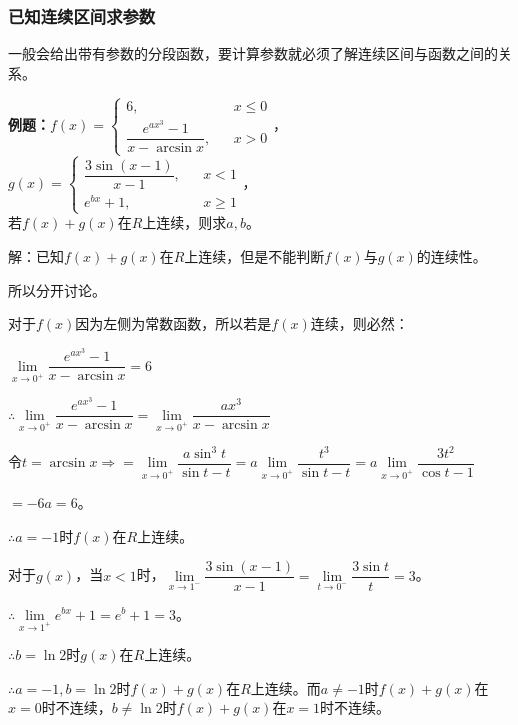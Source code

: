\subsubsection{已知连续区间求参数}

一般会给出带有参数的分段函数，要计算参数就必须了解连续区间与函数之间的关系。

\textbf{例题：}$f(x)=\left\{\begin{array}{lcl}
        6,                               &  & x\leqslant 0 \\
    \dfrac{e^{ax^3}-1}{x-\arcsin x}, &  & x>0
    \end{array}
    \right.$，$g(x)=\left\{\begin{array}{lcl}
        \dfrac{3\sin(x-1)}{x-1}, &  & x<1          \\
        e^{bx}+1,                &  & x\geqslant 1
    \end{array}
    \right.$，\smallskip \\ 若$f(x)+g(x)$在$R$上连续，则求$a,b$。

解：已知$f(x)+g(x)$在$R$上连续，但是不能判断$f(x)$与$g(x)$的连续性。

所以分开讨论。

对于$f(x)$因为左侧为常数函数，所以若是$f(x)$连续，则必然：\medskip

$\lim\limits_{x\to 0^+}\dfrac{e^{ax^3}-1}{x-\arcsin x}=6$\medskip

$\therefore\lim\limits_{x\to 0^+}\dfrac{e^{ax^3}-1}{x-\arcsin x}=\lim\limits_{x\to 0^+}\dfrac{ax^3}{x-\arcsin x}$\medskip

$\text{令}t=\arcsin x\Rightarrow=\lim\limits_{x\to 0^+}\dfrac{a\sin^3t}{\sin t-t}=a\lim\limits_{x\to 0^+}\dfrac{t^3}{\sin t-t}=a\lim\limits_{x\to 0^+}\dfrac{3t^2}{\cos t-1}$

$=-6a=6$。

$\therefore a=-1$时$f(x)$在$R$上连续。\medskip

对于$g(x)$，当$x<1$时，$\lim\limits_{x\to 1^-}\dfrac{3\sin(x-1)}{x-1}=\lim\limits_{t\to 0^-}\dfrac{3\sin t}{t}=3$。\medskip

$\therefore\lim\limits_{x\to 1^+}e^{bx}+1=e^b+1=3$。\medskip

$\therefore b=\ln 2$时$g(x)$在$R$上连续。\medskip

$\therefore a=-1,b=\ln 2$时$f(x)+g(x)$在$R$上连续。而$a\neq -1$时$f(x)+g(x)$在$x=0$时不连续，$b\neq\ln 2$时$f(x)+g(x)$在$x=1$时不连续。

\paragraph{}


